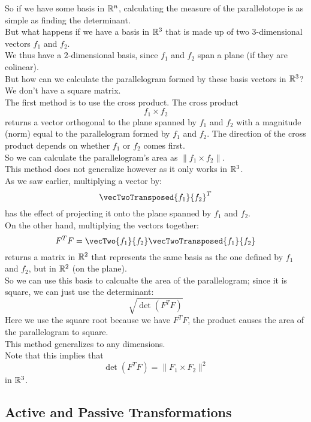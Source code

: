 \documentclass[12pt]{article}
\begin{document}
So if we have some basis in $\mathbb{R}^n$,
calculating the measure of the
parallelotope is as simple as finding the
determinant. \\

But what happens if we have a basis in $\mathbb{R}^3$
that is made up of two $3$-dimensional vectors $f_1$
and $f_2$. \\
We thus have a $2$-dimensional basis,
since $f_1$ and $f_2$ span a plane
(if they are colinear). \\
But how can we calculate the parallelogram
formed by these basis vectors in $\mathbb{R}^3$?
We don't have a square matrix. \\

The first method is to use the cross product.
The cross product
\[ f_1 \times f_2 \]
returns a vector orthogonal to the plane
spanned by $f_1$ and $f_2$
with a magnitude (norm) equal to
the parallelogram formed by $f_1$ and $f_2$.
The direction of the cross product
depends on whether $f_1$ or $f_2$
comes first. \\
So we can calculate the parallelogram's
area as $\|f_1 \times f_2\|$. \\

This method does not generalize however
as it only works in $\mathbb{R}^3$. \\
As we saw earlier,
multiplying a vector by:
\[ \vecTwoTransposed{f_1}{f_2}^T \]
has the effect of projecting it
onto the plane spanned by $f_1$ and $f_2$. \\
On the other hand,
multiplying the vectors together:
\[ F^TF = \vecTwo{f_1}{f_2}
\vecTwoTransposed{f_1}{f_2} \]
returns a matrix in $\mathbb{R}^2$
that represents the same basis
as the one defined by $f_1$ and $f_2$,
but in $\mathbb{R}^2$ (on the plane). \\
So we can use this basis to calcualte
the area of the parallelogram;
since it is square,
we can just use the determinant:
\[ \sqrt{\det(F^TF)} \]
Here we use the square root because we have
$F^TF$,
the product causes the area of the parallelogram
to square. \\
This method generalizes to any dimensions. \\

Note that this implies that
\[ \det(F^TF) = \|F_1 \times F_2\|^2 \]
in $\mathbb{R}^3$. \\

\newpage

\subsection*{Active and Passive Transformations}
\end{document}
